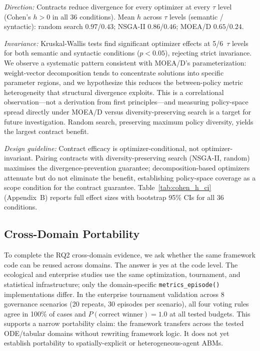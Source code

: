 \documentclass{wscpaperproc}
\begin{document}
\emph{Direction:} Contracts reduce divergence for every optimizer at every
$\tau$ level (Cohen's $h\!>\!0$ in all 36 conditions). Mean $h$ across
$\tau$ levels (semantic / syntactic): random search $0.97$/$0.43$; NSGA-II
$0.86$/$0.46$; MOEA/D $0.65$/$0.24$.

\emph{Invariance:} Kruskal-Wallis tests find significant optimizer effects at
5/6~$\tau$ levels for both semantic and syntactic conditions ($p\!<\!0.05$),
rejecting strict invariance. We observe a systematic pattern consistent with
MOEA/D's parameterization: weight-vector decomposition tends to concentrate
solutions into specific parameter regions, and we hypothesize this reduces the
between-policy metric heterogeneity that structural divergence exploits. This is
a correlational observation---not a derivation from first principles---and measuring policy-space spread directly under MOEA/D versus diversity-preserving
search is a target for future investigation. Random search, preserving maximum
policy diversity, yields the largest contract benefit.

\emph{Design guideline:} Contract efficacy is optimizer-conditional, not
optimizer-invariant. Pairing contracts with diversity-preserving search (NSGA-II,
random) maximises the divergence-prevention guarantee; decomposition-based optimizers
attenuate but do not eliminate the benefit, establishing policy-space coverage as
a scope condition for the contract guarantee. Table~\ref{tab:cohen_h_ci} (Appendix~B)
reports full effect sizes with bootstrap 95\% CIs for all 36 conditions.



\subsection{Cross-Domain Portability}
\label{sec:crossdomain}

To complete the RQ2 cross-domain evidence, we ask whether the same framework
code can be reused across domains. The answer is yes at the code level. The ecological and
enterprise studies use the same optimization, tournament, and statistical
infrastructure; only the domain-specific \texttt{metrics\_episode()}
implementations differ. In the enterprise tournament validation across 8
governance scenarios (20 repeats, 30 episodes per scenario), all four voting
rules agree in 100\% of cases and $P(\text{correct winner})\!=\!1.0$ at all
tested budgets. This supports a narrow portability claim: the framework
transfers across the tested ODE/tabular domains without rewriting framework
logic. It does not yet establish portability to spatially-explicit or
heterogeneous-agent ABMs.
\end{document}
